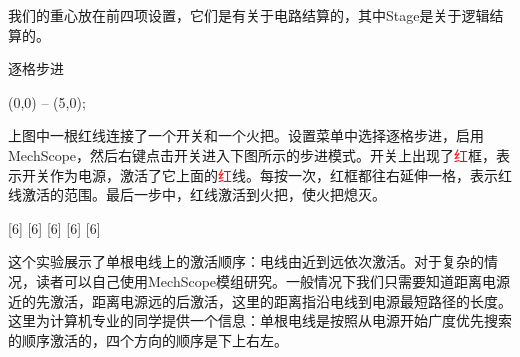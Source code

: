 我们的重心放在前四项设置，它们是有关于电路结算的，其中Stage是关于逻辑结算的。

\begin{example}{逐格步进}{}

  \begin{center}
    \begin{tikzpictureC}[TRsch]
       (0,0) -- (5,0);
    \end{tikzpictureC}
  \end{center}

  上图中一根红线连接了一个开关和一个火把。设置菜单中选择逐格步进，启用MechScope，然后右键点击开关进入下图所示的步进模式。开关上出现了\textcolor{red}{红}框，表示开关作为电源，激活了它上面的\textcolor{red}{红}线。每按一次，红框都往右延伸一格，表示红线激活的范围。最后一步中，红线激活到火把，使火把熄灭。

  \begin{center}
    [6]%
    [6]%
    [6]%
    [6]%
    [6]%
  \end{center}

  \begin{remark*}{}{}
    这个实验展示了单根电线上的激活顺序：电线由近到远依次激活。对于复杂的情况，读者可以自己使用MechScope模组研究。一般情况下我们只需要知道距离电源近的先激活，距离电源远的后激活，这里的距离指沿电线到电源最短路径的长度。这里为计算机专业的同学提供一个信息：单根电线是按照从电源开始广度优先搜索的顺序激活的，四个方向的顺序是下上右左。
  \end{remark*}

\end{example}

